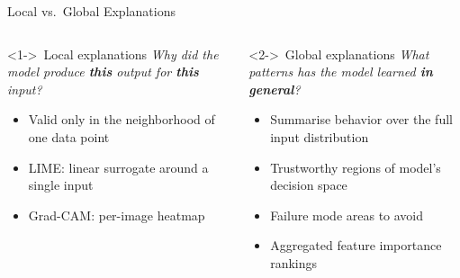 \documentclass[aspectratio=169]{beamer}
\begin{document}
\begin{frame}{Local vs.\ Global Explanations}
  \begin{columns}[T]
      \begin{block}<1->{\faSearchLocation\ Local explanations}
        \emph{Why did the model produce \textbf{this} output for \textbf{this} input?}
        \begin{itemize}
          \item Valid only in the neighborhood of one data point
          \item LIME: linear surrogate around a single input
          \item Grad-CAM: per-image heatmap
        \end{itemize}
      \end{block}
      \begin{block}<2->{\faGlobe\ Global explanations}
        \emph{What patterns has the model learned \textbf{in general}?}
        \begin{itemize}
          \item Summarise behavior over the full input distribution
          \item Trustworthy regions of model's decision space
          \item Failure mode areas to avoid
          \item Aggregated feature importance rankings
        \end{itemize}
      \end{block}
  \end{columns}
\end{frame}
\end{document}
